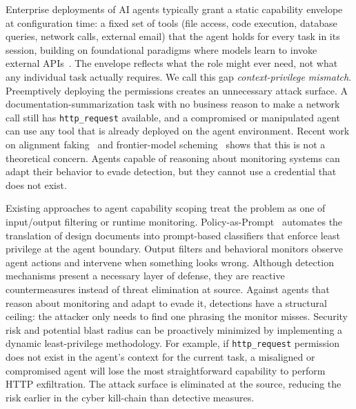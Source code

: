 \documentclass{article}
\theoremstyle{plain}
\theoremstyle{definition}
\theoremstyle{remark}
\begin{document}
Enterprise deployments of AI agents typically grant a static capability envelope at configuration time: a fixed set of tools (file access, code execution, database queries, network calls, external email) that the agent holds for every task in its session, building on foundational paradigms where models learn to invoke external APIs~\citep{schick2023toolformer}. The envelope reflects what the role might ever need, not what any individual task actually requires. We call this gap \emph{context-privilege mismatch}. Preemptively deploying the permissions creates an unnecessary attack surface. A documentation-summarization task with no business reason to make a network call still has \texttt{http\_request} available, and a compromised or manipulated agent can use any tool that is already deployed on the agent environment. Recent work on alignment faking~\citep{greenblatt2024alignment} and frontier-model scheming~\citep{apollo2024scheming} shows that this is not a theoretical concern. Agents capable of reasoning about monitoring systems can adapt their behavior to evade detection, but they cannot use a credential that does not exist.

Existing approaches to agent capability scoping treat the problem as one of input/output filtering or runtime monitoring. Policy-as-Prompt~\citep{tsai2025conseca} automates the translation of design documents into prompt-based classifiers that enforce least privilege at the agent boundary. Output filters and behavioral monitors observe agent actions and intervene when something looks wrong. Although detection mechanisms present a necessary layer of defense, they are reactive countermeasures instead of threat elimination at source. Against agents that reason about monitoring and adapt to evade it, detections have a structural ceiling: the attacker only needs to find one phrasing the monitor misses. Security risk and potential blast radius can be proactively minimized by implementing a dynamic least-privilege methodology. For example, if \texttt{http\_request} permission does not exist in the agent's context for the current task, a misaligned or compromised agent will lose the most straightforward capability to perform HTTP exfiltration. The attack surface is eliminated at the source, reducing the risk earlier in the cyber kill-chain than detective measures.
\end{document}
